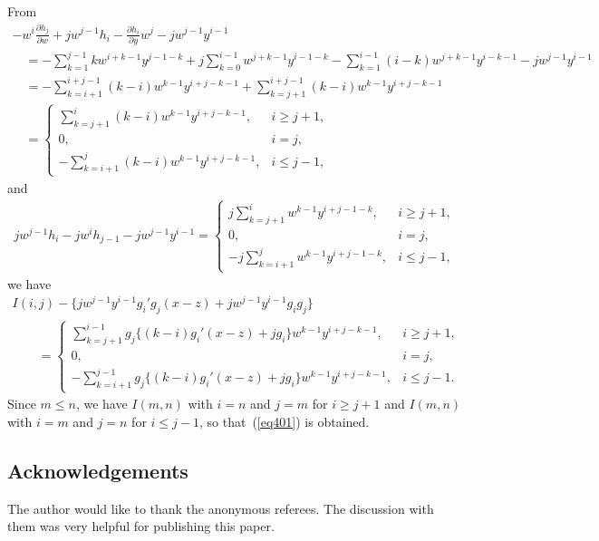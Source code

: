 \documentclass[pdftex]{sigma}
\numberwithin{equation}{section}
\theoremstyle{definition}
\begin{document}
From
\begin{gather*}
-w^i\frac{\partial h_j}{\partial w}+jw^{j-1}h_i -\frac{\partial h_i}{\partial y}w^j-jw^{j-1}y^{i-1}\\
\quad{}=-\sum_{k=1}^{j-1}kw^{i+k-1}y^{j-1-k}+j\sum_{k=0}^{i-1}w^{j+k-1}y^{i-1-k}-\sum_{k=1}^{i-1}(i-k)w^{j+k-1}y^{i-k-1}-jw^{j-1}y^{i-1}\\
\quad{} =-\sum_{k=i+1}^{i+j-1}(k-i)w^{k-1}y^{i+j-k-1}+\sum_{k=j+1}^{i+j-1}(k-i)w^{k-1}y^{i+j-k-1}\\
\quad{}=\begin{cases}
\sum\limits_{k=j+1}^{i}(k-i)w^{k-1}y^{i+j-k-1}, &i\geq j+1,\\
0, &i=j,\\
-\sum\limits_{k=i+1}^{j}(k-i)w^{k-1}y^{i+j-k-1},& i\leq j-1,
\end{cases}
\end{gather*}
and
\begin{gather*}
jw^{j-1}h_i-jw^ih_{j-1}-jw^{j-1}y^{i-1}
=
\begin{cases}
j\sum\limits_{k=j+1}^{i}w^{k-1}y^{i+j-1-k}, &i\geq j+1,\\
0, &i=j, \\
-j\sum\limits_{k=i+1}^{j}w^{k-1}y^{i+j-1-k}, &i\leq j-1,
\end{cases}
\end{gather*}
we have
\begin{gather*}
 I(i,j)- \big\{jw^{j-1}y^{i-1}g_i'g_j(x-z)+jw^{j-1}y^{i-1}g_ig_j\big\}\\
\qquad{} = \begin{cases}
\sum\limits_{k=j+1}^{i-1}g_j\{(k-i)g_i'(x-z)+jg_i\}w^{k-1}y^{i+j-k-1}, &i\geq j+1,\\
0, &i=j,\\
-\sum\limits_{k=i+1}^{j-1}g_j\{(k-i)g_i'(x-z)+jg_i\}w^{k-1}y^{i+j-k-1}, &i\leq j-1.
\end{cases}%
\end{gather*}
Since $m\leq n$, we have $I(m,n)$ with $i=n$ and $j=m$ for $i\geq j+1$ and $I(m,n)$ with $i=m$ and $j=n$ for $i\leq j-1$, so that~(\ref{eq401}) %
is obtained.

\subsection*{Acknowledgements}
The author would like to thank the anonymous referees. The discussion with them was very helpful for publishing this paper.

\LastPageEnding
\end{document}
